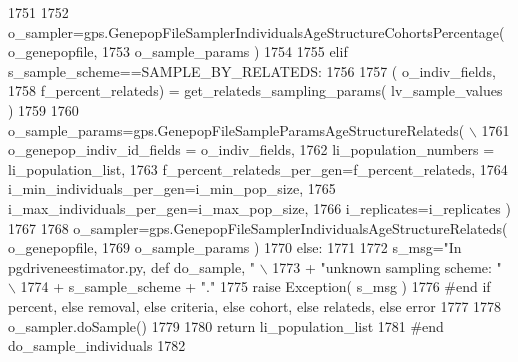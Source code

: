 \begin{DoxyCode}
1751 
1752         o\_sampler=gps.GenepopFileSamplerIndividualsAgeStructureCohortsPercentage( o\_genepopfile,
1753                                                                                     o\_sample\_params )
1754                                 
1755     \textcolor{keywordflow}{elif} s\_sample\_scheme==SAMPLE\_BY\_RELATEDS:
1756 
1757             ( o\_indiv\_fields,
1758                 f\_percent\_relateds) = get\_relateds\_sampling\_params( lv\_sample\_values )
1759 
1760             o\_sample\_params=gps.GenepopFileSampleParamsAgeStructureRelateds( \(\backslash\)
1761                                         o\_genepop\_indiv\_id\_fields = o\_indiv\_fields,
1762                                         li\_population\_numbers = li\_population\_list,
1763                                         f\_percent\_relateds\_per\_gen=f\_percent\_relateds,
1764                                         i\_min\_individuals\_per\_gen=i\_min\_pop\_size,
1765                                         i\_max\_individuals\_per\_gen=i\_max\_pop\_size,
1766                                         i\_replicates=i\_replicates )
1767 
1768             o\_sampler=gps.GenepopFileSamplerIndividualsAgeStructureRelateds( o\_genepopfile,
1769                                                                     o\_sample\_params )
1770     \textcolor{keywordflow}{else}:
1771 
1772         s\_msg=\textcolor{stringliteral}{"In pgdriveneestimator.py, def do\_sample, "} \(\backslash\)
1773                 + \textcolor{stringliteral}{"unknown sampling scheme: "} \(\backslash\)
1774                 + s\_sample\_scheme + \textcolor{stringliteral}{"."}
1775         \textcolor{keywordflow}{raise} Exception( s\_msg )
1776     \textcolor{comment}{#end if percent, else removal, else criteria, else cohort, else relateds, else error}
1777 
1778     o\_sampler.doSample()
1779 
1780     \textcolor{keywordflow}{return} li\_population\_list
1781 \textcolor{comment}{#end do\_sample\_individuals}
1782 
\end{DoxyCode}
